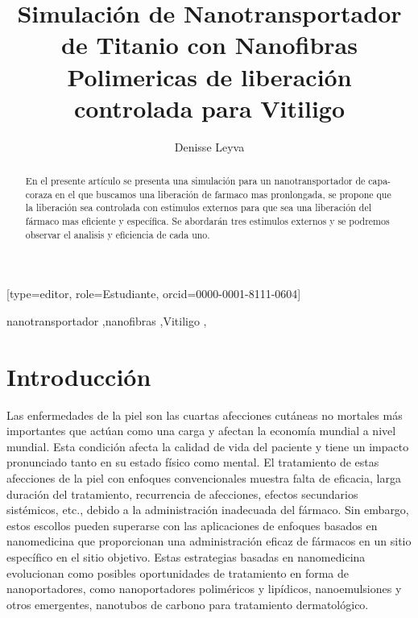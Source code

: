 \documentclass[a4paper,fleqn]{cas-sc}
\begin{document}
\title [mode = title]{Simulación de Nanotransportador de Titanio con Nanofibras Polimericas de liberación controlada para Vitiligo}                    




\author[1,3]{Denisse Leyva}[type=editor,
                        role=Estudiante,
                        orcid=0000-0001-8111-0604]
\cormark[1]
\fnmark[1]



\address[1]{Posgrado en Ciencias de la Ingeniera con Orientación en Nanotecnología}
\address[2]{Facultad de Ingenieria Mecánica y Eléctrica}
\address[3]{Universidad Autónoma de Nuevo León.}



\begin{abstract}
En el presente artículo se presenta una simulación para un nanotransportador de capa-coraza en el que buscamos una liberación de farmaco mas pronlongada, se propone que la liberación sea controlada con estimulos externos para que sea una liberación del fármaco mas eficiente y específica. Se abordarán tres estimulos externos y se podremos observar el analisis y eficiencia de cada uno.
\end{abstract}


\begin{keywords}
nanotransportador \sep nanofibras \sep Vitiligo \sep \BEC
\end{keywords}


\maketitle


\section{Introducción}
Las enfermedades de la piel son las cuartas afecciones cutáneas no mortales más importantes que actúan como una carga y afectan la economía mundial a nivel mundial. Esta condición afecta la calidad de vida del paciente y tiene un impacto pronunciado tanto en su estado físico como mental. El tratamiento de estas afecciones de la piel con enfoques convencionales muestra falta de eficacia, larga duración del tratamiento, recurrencia de afecciones, efectos secundarios sistémicos, etc., debido a la administración inadecuada del fármaco. Sin embargo, estos escollos pueden superarse con las aplicaciones de enfoques basados en nanomedicina que proporcionan una administración eficaz de fármacos en un sitio específico en el sitio objetivo. Estas estrategias basadas en nanomedicina evolucionan como posibles oportunidades de tratamiento en forma de nanoportadores, como nanoportadores poliméricos y lipídicos, nanoemulsiones y otros emergentes, nanotubos de carbono para tratamiento dermatológico. 
\end{document}
